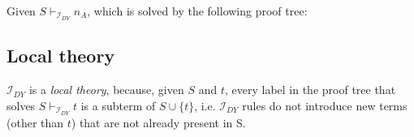     \noindent
    Given $S \vdash_{\mathcal{I}_{DY}} n_A$, which is solved by the following proof tree:

    \begin{prooftree}
         
    \end{prooftree}

\subsection{Local theory}
$\mathcal{I}_{DY}$ is a \emph{local theory}, because, given $S$ and $t$, every label in the proof tree that solves $S \vdash_{\mathcal{I}_{DY}} t$ is a subterm of $S \cup \{t\}$, i.e. $\mathcal{I}_{DY}$ rules do not introduce new terms (other than $t$) that are not already present in S.
